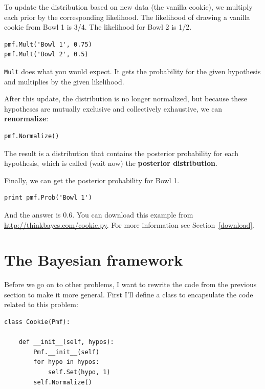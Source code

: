 \documentclass[12pt]{book}
\begin{document}
To update the distribution based on new data (the vanilla cookie),
we multiply each prior by the corresponding likelihood.  The likelihood
of drawing a vanilla cookie from Bowl 1 is 3/4.  The likelihood
for Bowl 2 is 1/2.

\begin{verbatim}
pmf.Mult('Bowl 1', 0.75)
pmf.Mult('Bowl 2', 0.5)
\end{verbatim}

\verb"Mult" does what you would expect.  It gets the probability
for the given hypothesis and multiplies by the given likelihood.

After this update, the distribution is no longer normalized, but
because these hypotheses are mutually exclusive and collectively
exhaustive, we can {\bf renormalize}:

\begin{verbatim}
pmf.Normalize()
\end{verbatim}

The result is a distribution that contains the posterior probability
for each hypothesis, which is called (wait now) the
{\bf posterior distribution}.

Finally, we can get the posterior probability for Bowl 1.

\begin{verbatim}
print pmf.Prob('Bowl 1')
\end{verbatim}

And the answer is 0.6.  You can download this example
from \url{http://thinkbayes.com/cookie.py}.  For more information
see Section~\ref{download}.


\section{The Bayesian framework}
\label{framework}

Before we go on to other problems, I want to rewrite the code
from the previous section to make it more general.  First I'll
define a class to encapsulate the code related to this problem:

\begin{verbatim}
class Cookie(Pmf):

    def __init__(self, hypos):
        Pmf.__init__(self)
        for hypo in hypos:
            self.Set(hypo, 1)
        self.Normalize()
\end{verbatim}
\end{document}
